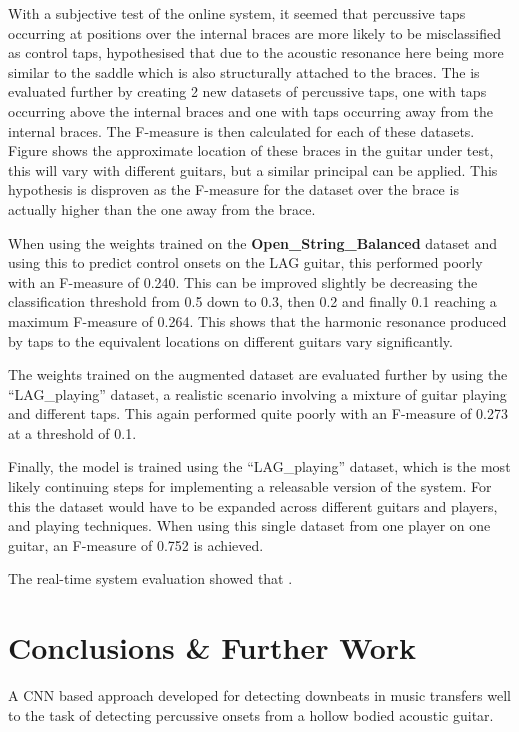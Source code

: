\documentclass[conference]{IEEEtran}
\begin{document}
With a subjective test of the online system, it seemed that percussive taps occurring at positions over the internal braces are more likely to be misclassified as control taps, hypothesised that due to the acoustic resonance here being more similar to the saddle which is also structurally attached to
the braces. The is evaluated further by creating 2 new datasets of percussive taps, one with taps occurring above the internal braces and one with taps occurring away from the internal braces. The F-measure is then calculated for each of these datasets.
Figure shows the approximate location of these braces in the guitar under test, this will vary with different guitars, but a similar principal can be applied. This hypothesis is disproven as the F-measure for the dataset over the brace is actually higher than the 
one away from the brace.

When using the weights trained on the \textbf{Open\_String\_Balanced} dataset and using this to predict control onsets on the LAG guitar, this performed poorly with an F-measure of 0.240. This can be improved slightly be decreasing the classification threshold from 0.5 down to 0.3, then 0.2 and finally 0.1 reaching
a maximum F-measure of 0.264. This shows that the harmonic resonance produced by taps to the equivalent locations on different guitars vary significantly.

The weights trained on the augmented dataset are evaluated further by using the ``LAG\_playing'' dataset, a realistic scenario involving a mixture of guitar playing and different taps. This again performed quite poorly with an F-measure of 0.273 at a threshold of 0.1. 

Finally, the model is trained using the ``LAG\_playing'' dataset, which is the most likely continuing steps for implementing a releasable version of the system. For this the dataset would have to be expanded across different guitars and players, and playing techniques. When using this single dataset
from one player on one guitar, an F-measure of 0.752 is achieved. 

The real-time system evaluation showed that .

\section{Conclusions \& Further Work}

A CNN based approach developed for detecting downbeats in music transfers well to the task of detecting percussive onsets from a hollow bodied acoustic guitar.
\end{document}
